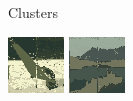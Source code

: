 \documentclass{beamer}
\begin{document}
\begin{frame}
\begin{figure}
\begin{subfigure}[b]{0.16\textwidth}
            \caption{Clusters}
        \end{subfigure}
        \hfill
        \begin{subfigure}[b]{0.16\textwidth}
            \centering
            \includegraphics[width=\textwidth]{../figures/dino/tile_2/62096_avg.png}
            \includegraphics[width=\textwidth]{../figures/dino/tile_2/219090_avg.png}

\end{subfigure}
\end{figure}
\end{frame}
\end{document}
